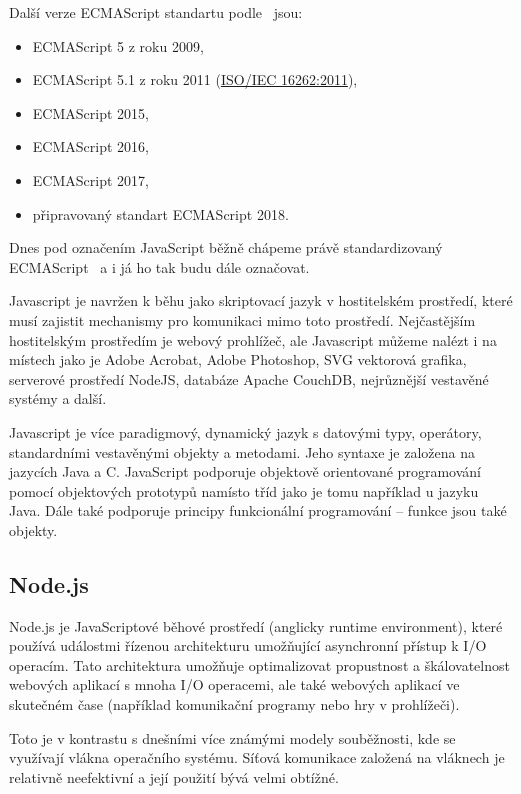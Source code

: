 Další verze ECMAScript standartu podle~\cite{mozzila:javascriptVersions} jsou:
\begin{itemize}
    \item ECMAScript 5 z roku 2009,
    \item ECMAScript 5.1 z roku 2011 (\href{http://www.iso.org/iso/iso_catalogue/catalogue_tc/catalogue_detail.htm?csnumber=55755}{ISO/IEC 16262:2011}),
    \item ECMAScript 2015,
    \item ECMAScript 2016,
    \item ECMAScript 2017,
    \item připravovaný standart ECMAScript 2018.
\end{itemize}

Dnes pod označením JavaScript běžně chápeme právě standardizovaný ECMAScript~\cite{mozzila:javascript} a i já ho tak budu dále označovat.

Javascript je navržen k běhu jako skriptovací jazyk v hostitelském prostředí, které musí zajistit mechanismy pro komunikaci mimo toto prostředí.
Nejčastějším hostitelským prostředím je webový prohlížeč, ale Javascript můžeme nalézt i na místech jako je Adobe Acrobat, Adobe Photoshop, SVG vektorová grafika, serverové prostředí NodeJS, databáze Apache CouchDB, nejrůznější vestavěné systémy a další.~\cite{mozzila:javascript}

Javascript je více paradigmový, dynamický jazyk s datovými typy, operátory, standardními vestavěnými objekty a metodami.
Jeho syntaxe je založena na jazycích Java a C.
JavaScript podporuje objektově orientované programování pomocí objektových prototypů namísto tříd jako je tomu například u jazyku Java.
Dále také podporuje principy funkcionální programování -- funkce jsou také objekty.~\cite{mozzila:javascript}

\subsection{Node.js}\label{subsec:nodejs}

Node.js je JavaScriptové běhové prostředí (anglicky runtime environment), které používá událostmi řízenou architekturu umožňující asynchronní přístup k \acrshort{I/O} operacím.
Tato architektura umožňuje optimalizovat propustnost a škálovatelnost webových aplikací s mnoha \acrshort{I/O} operacemi, ale také webových aplikací ve skutečném čase (například komunikační programy nebo hry v prohlížeči).~\cite{node:article2013}

Toto je v kontrastu s dnešními více známými modely souběžnosti, kde se využívají vlákna operačního systému.
Síťová komunikace založená na vláknech je relativně neefektivní a její použití bývá velmi obtížné.~\cite{node:about}

